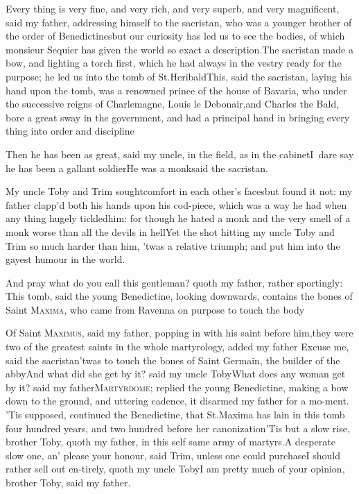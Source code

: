 \documentclass{article}
\begin{document}
Every thing is very fine, and very rich, and very superb, and very magnificent, said
my father, addressing himself to the sacristan, who was a younger brother of the
order of Benedictines\tsk but our curiosity has led us to see the bodies, of which
monsieur Sequier has given the world so exact a description.\tsk The sacristan made a
bow, and lighting a torch first, which he had always in the vestry ready for the
purpose; he led us into the\pb
tomb of St.\@ Heribald\tsh This, said the sacristan,
laying his hand upon the tomb, was a renowned prince of the house of Bavaria, who
under the successive reigns of Charlemagne, Louis le Debonair,\break and Charles the
Bald, bore a great sway in the government, and had a principal hand in bringing
every thing into order and discipline\tsh

Then he has been as great, said my uncle, in the field, as in
the cabinet\tsk I~dare say he has been a gallant
soldier\break\tsh He was a monk\tsk said the sacristan.

My uncle Toby and Trim sought\break comfort in each
other’s faces\tsk but found it not: my father clapp’d both
his hands upon his cod-piece, which was a way he had when any thing
hugely tickled\pb him: for though he hated a monk and the very smell
of a monk worse than all the devils in hell\tsh Yet the
shot hitting my uncle Toby and Trim so much harder
than him, ’twas a relative triumph; and put him into the
gayest humour in the world.

\tsh And pray what do you call this gentleman? quoth my
father, rather sportingly: This tomb, said the young
Benedictine, looking downwards, contains the bones of Saint
\textsc{Maxima}, who came from Ravenna on purpose to
touch the body\tsh

\tsh Of Saint \textsc{Maximus}, said my fa\-ther, popping in with his saint before
him,\break\tsk they were two of the greatest saints in the whole martyrology, added
my father\pb
\tsh Excuse me, said the sacristan\tsh\break\tsh ’twas to touch the bones
of Saint Germain, the builder of the abby\tsh And what did she
get by it? said my uncle Toby\tsh What does any woman get by it?
said my father\tsh \textsc{Martyrdome}; replied the young
Benedictine, making a bow down to the ground, and uttering 
cadence, it disarmed my
father for a mo-\break ment. ’Tis supposed, continued the Bene\-dictine,
that St.\@ Maxima has lain in this tomb four hundred years, and
two hundred before her canonization\tsh ’Tis but a slow rise,
brother Toby, quoth my father, in this self same army of
martyrs.\break\tsh A desperate slow one, an’ please your honour, said
Trim, unless one could purchase\tsh I should rather sell out
en-\pb tirely, quoth my uncle Toby\tsh I am pretty much of your
opinion, brother Toby, said my father.
\end{document}
